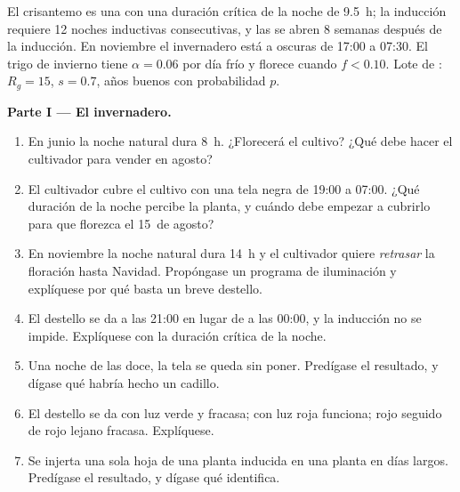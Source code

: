 \begin{problem}
\label{pb:b2:plant-flowering:1}
El crisantemo es una  con una duración crítica de la
noche de \qty{9.5}{h}; la inducción requiere \num{12} noches inductivas
consecutivas, y las  se abren \num{8} semanas después de la
inducción. En noviembre el invernadero está a oscuras de 17:00 a 07:30.
El trigo de invierno tiene $\alpha = 0.06$ por día frío y florece cuando
$f < 0.10$. Lote de : $R_g = 15$, $s = 0.7$, años buenos con
probabilidad $p$.

\medskip
\noindent\textbf{Parte I --- El invernadero.}
\begin{enumerate}
  \item En junio la noche natural dura \qty{8}{h}. ¿Florecerá el cultivo?
        ¿Qué debe hacer el cultivador para vender  en agosto?
  \item El cultivador cubre el cultivo con una tela negra de 19:00 a
        07:00. ¿Qué duración de la noche percibe la planta, y cuándo debe
        empezar a cubrirlo para que florezca el 15~de agosto?
  \item En noviembre la noche natural dura \qty{14}{h} y el cultivador
        quiere \emph{retrasar} la floración hasta Navidad. Propóngase un
        programa de iluminación y explíquese por qué basta un breve
        destello.
  \item El destello se da a las 21:00 en lugar de a las 00:00, y la
        inducción no se impide. Explíquese con la duración crítica de la
        noche.
  \item Una noche de las doce, la tela se queda sin poner. Predígase el
        resultado, y dígase qué habría hecho un cadillo.
  \item El destello se da con luz verde y fracasa; con luz roja funciona;
        rojo seguido de rojo lejano fracasa. Explíquese.
  \item Se injerta una sola hoja de una planta inducida en una planta en
        días largos. Predígase el resultado, y dígase qué identifica.
\end{enumerate}


\end{problem}
